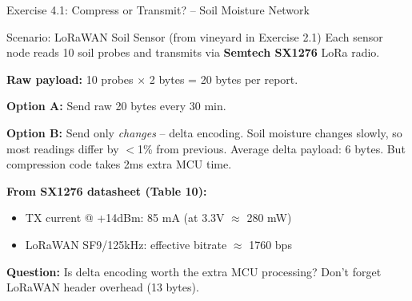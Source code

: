 \documentclass[aspectratio=169,11pt]{beamer}
\begin{document}
\begin{frame}{Exercise 4.1: Compress or Transmit? -- Soil Moisture Network}
    \begin{block}{Scenario: LoRaWAN Soil Sensor (from vineyard in Exercise 2.1)}
        Each sensor node reads 10 soil probes and transmits via \textbf{Semtech SX1276} LoRa radio.
        
        \vspace{0.2cm}
        \textbf{Raw payload:} 10 probes $\times$ 2 bytes = 20 bytes per report.
        
        \textbf{Option A:} Send raw 20 bytes every 30 min.
        
        \textbf{Option B:} Send only \textit{changes} -- delta encoding. Soil moisture changes slowly, so most readings differ by $<$1\% from previous. Average delta payload: 6 bytes. But compression code takes 2ms extra MCU time.
    \end{block}
    
    \vspace{0.1cm}
    \textbf{From SX1276 datasheet (Table 10):}
    \begin{itemize}
        \item TX current @ +14dBm: 85 mA (at 3.3V $\approx$ 280 mW)
        \item LoRaWAN SF9/125kHz: effective bitrate $\approx$ 1760 bps
    \end{itemize}
    
    \textbf{Question:} Is delta encoding worth the extra MCU processing? Don't forget LoRaWAN header overhead (13 bytes).
\end{frame}
\end{document}
